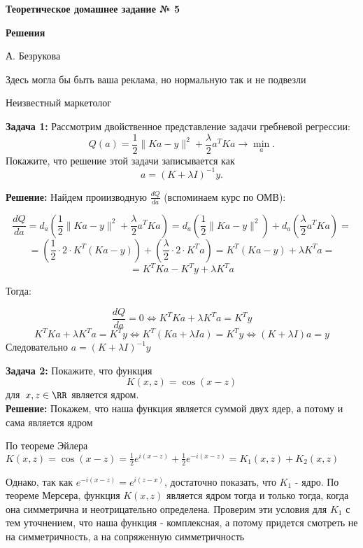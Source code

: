 \documentclass[12pt,letterpaper]{article}
\theoremstyle{definition}
\begin{document}
\centerline{\Large {\textbf{Теоретическое домашнее задание № 5}}}
\vspace{5mm}
\centerline{\Large {\textbf{Решения}}}
\vspace{5mm}
\centerline{\large А. Безрукова}
\epigraph{Здесь могла бы быть ваша реклама, но нормальную так и не подвезли}{Неизвестный маркетолог}

\vspace{-3mm}
\setcounter{zd}{1}

\large{
\textbf{Задача 1:}
Рассмотрим двойственное представление задачи гребневой регрессии:
    \[
        Q(a)
        =
        \frac{1}{2} \| K a - y \|^2 + \frac{\lambda}{2} a^T K a \to \min_a.
    \]
        Покажите, что решение этой задачи записывается как
    \[
a = (K + \lambda I)^{-1} y.
    \]
    
\textbf{Решение:}
Найдем проиизводную $\frac{dQ}{da}$ (вспоминаем курс по ОМВ):

\[
        \frac{dQ}{da} = d_{a}\left( \frac{1}{2} \| K a - y \|^2 + \frac{\lambda}{2} a^T K a \right)
        =
        d_{a}\left( \frac{1}{2} \| K a - y \|^2 \right) + d_{a}\left( \frac{\lambda}{2} a^T K a \right) =
    \]
    \[
        = \left( \frac{1}{2}  \cdot 2 \cdot K^{T}  \left(K a - y\right) \right) + \left( \frac{\lambda}{2}  \cdot 2 \cdot K^{T}a \right) = K^{T}  \left(K a - y\right) + \lambda K^{T}a = 
    \]
    \[
        = K^{T} K a - K^{T} y + \lambda K^{T}a 
    \]

Тогда:

\[
        \frac{dQ}{da} = 0 \Longleftrightarrow K^{T} K a  + \lambda K^{T}a = K^{T} y
    \]
    \[
        K^{T} K a  + \lambda K^{T}a = K^{T} y \Longleftrightarrow K^{T} \left(K a + \lambda Ia \right) = K^{T} y \Longleftrightarrow \left(K + \lambda I\right)a = y
    \]
Следовательно $a = \left(K + \lambda I\right)^{-1}y$
\newpage

\textbf{Задача 2:} Покажите, что функция
    \[
        K(x, z) = \cos(x - z)
    \]
    для~$x, z \in \RR$ является ядром.
\\

\textbf{Решение:} Покажем, что наша функция является суммой двух ядер, а потому и сама является ядром

По теореме Эйлера $K(x, z) = \cos(x - z) = \frac{1}{2} e^{i(x - z)} + \frac{1}{2} e^{-i(x - z)} = K_{1}(x, z) + K_{2}(x, z)$

Однако, так как $e^{-i(x - z)} = e^{i(z - x)} $, достаточно показать, что $K_{1}$ - ядро. По теореме Мерсера, функция $K(x, z)$ является ядром тогда и только тогда, когда она симметрична и неотрицательно определена. Проверим эти условия для $K_{1}$ с тем уточнением, что наша функция - комплексная, а потому придется смотреть не на симметричность, а на сопряженную симметричность

}
\end{document}
